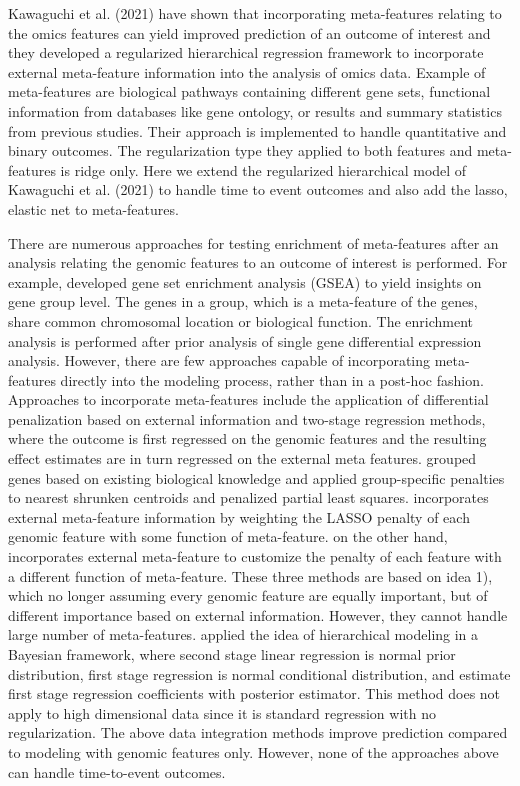 Kawaguchi et al. (2021) have shown that incorporating meta-features relating to the omics features can yield improved prediction of an outcome of interest and they developed a regularized hierarchical regression framework to incorporate external meta-feature information into the analysis of omics data. Example of meta-features are biological pathways containing different gene sets, functional information from databases like gene ontology, or results and summary statistics from previous studies. Their approach is implemented to handle quantitative and binary outcomes. The regularization type they applied to both features and meta-features is ridge only. Here we extend the regularized hierarchical model of Kawaguchi et al. (2021) to handle time to event outcomes and also add the lasso, elastic net to meta-features.

There are numerous approaches for testing enrichment of meta-features after an analysis relating the genomic features to an outcome of interest is performed. For example, \cite{subramanian2005gene} developed gene set enrichment analysis (GSEA) to yield insights on gene group level. The genes in a group, which is a meta-feature of the genes, share common chromosomal location or biological function. The enrichment analysis is performed after prior analysis of single gene differential expression analysis. However, there are few approaches capable of incorporating meta-features directly into the modeling process, rather than in a post-hoc fashion. Approaches to incorporate meta-features include the application of differential penalization based on external information and two-stage regression methods, where the outcome is first regressed on the genomic features and the resulting effect estimates are in turn regressed on the external meta features. \cite{tai2007incorporating} grouped genes based on existing biological knowledge and applied group-specific penalties to nearest shrunken centroids and penalized partial least squares. \cite{bergersen2011weighted} incorporates external meta-feature information by weighting the LASSO penalty of each genomic feature with some function of meta-feature. \cite{zeng2021incorporating} on the other hand, incorporates external meta-feature to customize the penalty of each feature with a different function of meta-feature. These three methods are based on idea 1), which no longer assuming every genomic feature are equally important, but of different importance based on external information. However, they cannot handle large number of meta-features. \cite{chen2007enriching} applied the idea of hierarchical modeling in a Bayesian framework, where second stage linear regression is normal prior distribution, first stage regression is normal conditional distribution, and estimate first stage regression coefficients with posterior estimator. This method does not apply to high dimensional data since it is standard regression with no regularization. The above data integration methods improve prediction compared to modeling with genomic features only. However, none of the approaches above can handle time-to-event outcomes.

